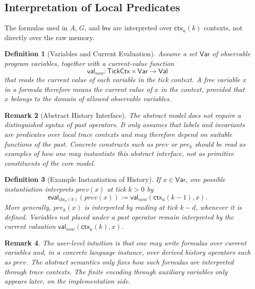 \documentclass[11pt,a4paper]{article}
\newtheorem{definition}{Definition}[section]
\newtheorem{remark}[definition]{Remark}
\newcommand{\TickCtx}{\mathsf{TickCtx}}
\newcommand{\UserInv}{\mathsf{Inv}}
\newcommand{\ctx}{\mathsf{ctx}}
\begin{document}
\subsection{Interpretation of Local Predicates}

The formulas used in \(A\), \(G\), and \(\UserInv\) are interpreted over
\(\ctx_u(k)\) contexts, not directly over the raw memory.

\begin{definition}[Variables and Current Evaluation]
Assume a set \(\mathsf{Var}\) of observable program variables, together with a
current-value function
\[
\mathsf{val}_{\mathit{now}} : \TickCtx \times \mathsf{Var} \to \mathsf{Val}
\]
that reads the current value of each variable in the tick context. A free
variable \(x\) in a formula therefore means the current value of \(x\) in the
context, provided that \(x\) belongs to the domain of allowed observable
variables.
\end{definition}

\begin{remark}[Abstract History Interface]
The abstract model does not require a distinguished syntax of past operators.
It only assumes that labels and invariants are predicates over local trace
contexts and may therefore depend on suitable functions of the past. Concrete
constructs such as \(prev\) or \(pre_k\) should be read as examples of how one
may instantiate this abstract interface, not as primitive constituents of the
core model.
\end{remark}

\begin{definition}[Example Instantiation of History]
If \(x \in \mathsf{Var}\), one possible instantiation interprets \(prev(x)\) at
tick \(k>0\) by
\[
\mathsf{eval}_{\ctx_u(k)}(prev(x)) :=
\mathsf{val}_{\mathit{now}}(\ctx_u(k-1),x).
\]
More generally, \(pre_k(x)\) is interpreted by reading at tick \(k-d\), whenever
it is defined. Variables not placed under a past operator remain interpreted by
the current valuation
\(\mathsf{val}_{\mathit{now}}(\ctx_u(k),x)\).
\end{definition}

\begin{remark}
The user-level intuition is that one may write formulas over current variables
and, in a concrete language instance, over derived history operators such as
\(prev\). The abstract semantics only fixes how such formulas are interpreted
through trace contexts. The finite encoding through auxiliary variables only
appears later, on the implementation side.
\end{remark}
\end{document}
